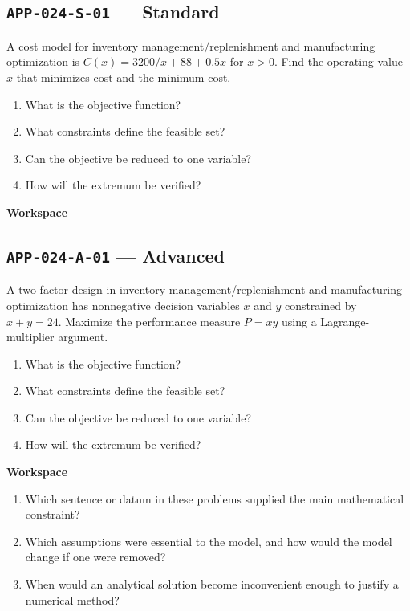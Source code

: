 \documentclass[11pt]{book}
\newcommand{\pid}[1]{\texttt{#1}}
\newcommand{\workspace}{\par\vspace{0.7in}\hrulefill\par\vspace{0.55in}\hrulefill\par}
\begin{document}
\subsection*{\pid{APP-024-S-01} — Standard}
\begin{problembox}
A cost model for inventory management/replenishment and manufacturing optimization is $C(x)=3200/x+88+0.5x$ for $x>0$. Find the operating value $x$ that minimizes cost and the minimum cost.
\end{problembox}
\begin{promptbox}\begin{enumerate}
\item What is the objective function?
\item What constraints define the feasible set?
\item Can the objective be reduced to one variable?
\item How will the extremum be verified?
\end{enumerate}\end{promptbox}
\textbf{Workspace}\workspace
{}
\subsection*{\pid{APP-024-A-01} — Advanced}
\begin{problembox}
A two-factor design in inventory management/replenishment and manufacturing optimization has nonnegative decision variables $x$ and $y$ constrained by $x+y=24$. Maximize the performance measure $P=xy$ using a Lagrange-multiplier argument.
\end{problembox}
\begin{promptbox}\begin{enumerate}
\item What is the objective function?
\item What constraints define the feasible set?
\item Can the objective be reduced to one variable?
\item How will the extremum be verified?
\end{enumerate}\end{promptbox}
\textbf{Workspace}\workspace
\begin{reflectionbox}\begin{enumerate}
\item Which sentence or datum in these problems supplied the main mathematical constraint?
\item Which assumptions were essential to the model, and how would the model change if one were removed?
\item When would an analytical solution become inconvenient enough to justify a numerical method?
\end{enumerate}\end{reflectionbox}
\end{document}
